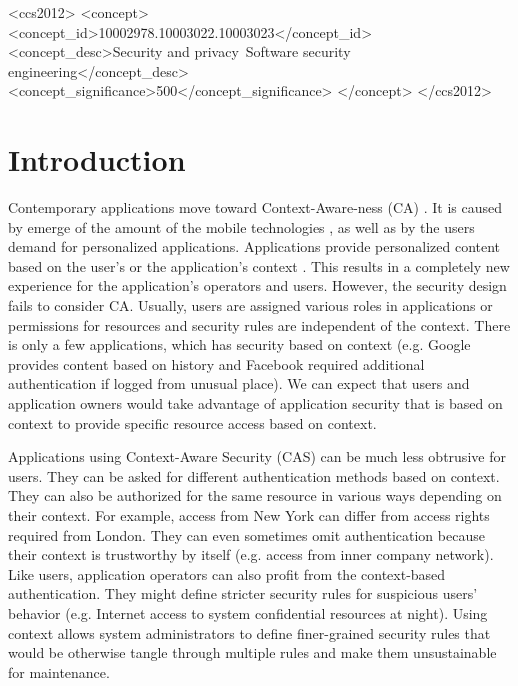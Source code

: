 \documentclass{sig-alternate-05-2015}
\begin{document}
%
%
\begin{CCSXML}
<ccs2012>
<concept>
<concept_id>10002978.10003022.10003023</concept_id>
<concept_desc>Security and privacy~Software security engineering</concept_desc>
<concept_significance>500</concept_significance>
</concept>
</ccs2012>
\end{CCSXML}


%
%

%
%
\printccsdesc



\section{Introduction}
Contemporary applications move toward Context-Aware-ness (CA) \cite{context,tomas1}. It is caused by emerge of the amount of the mobile technologies \cite{mobilecontext}, as well as by the users demand for personalized applications. Applications provide personalized content based on the user's or the application's context \cite{personalizedcontext}. This results in a completely new experience for the application's operators and users. However, the security design fails to consider CA. Usually, users are assigned various roles in applications or permissions for resources and security rules are independent of the context. There is only a few applications, which has security based on context (e.g. Google provides content based on history and Facebook required additional authentication if logged from unusual place). We can expect that users and application owners would take advantage of application security that is based on context to provide specific resource access based on context.

Applications using Context-Aware Security (CAS) can be much less obtrusive for users. They can be asked for different authentication methods based on context. They can also be authorized for the same resource in various ways depending on their context. For example, access from New York can differ from access rights required from London. They can even sometimes omit authentication because their context is trustworthy by itself (e.g. access from inner company network). Like users, application operators can also profit from the context-based authentication. They might define stricter security rules for suspicious users' behavior (e.g. Internet access to system confidential resources at night). Using context allows system administrators to define finer-grained security rules that would be otherwise tangle through multiple rules and make them unsustainable for maintenance. 
\end{document}
